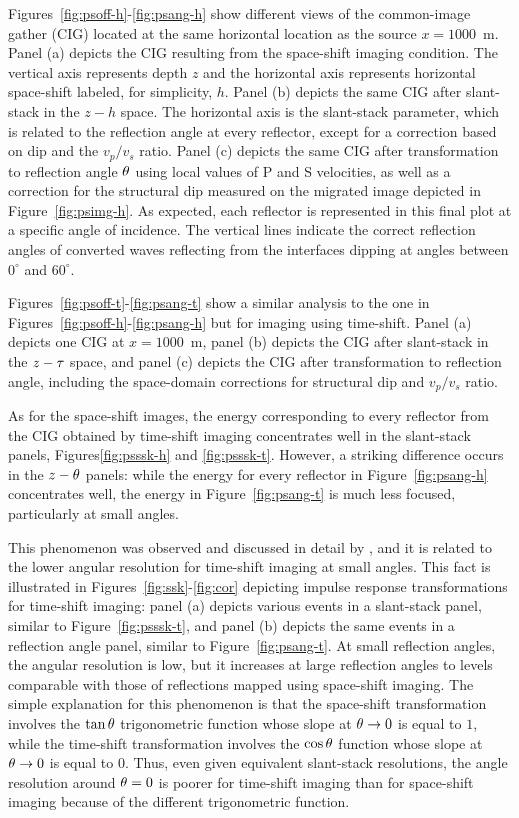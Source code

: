 Figures~\ref{fig:psoff-h}-\ref{fig:psang-h}
show different views of the common-image gather (CIG) located at the 
same horizontal location as the source $x=1000$~m.
Panel (a) depicts the CIG resulting from the space-shift imaging
condition. The vertical axis represents depth $z$ and the horizontal
axis represents horizontal space-shift labeled, for simplicity, $h$.
Panel (b) depicts the same CIG after slant-stack in the $z-h$ space.
The horizontal axis is the slant-stack parameter, which is related to
the reflection angle at every reflector, except for a correction based
on dip and the $v_p/v_s$ ratio.
Panel (c) depicts the same CIG after transformation to reflection 
angle $\t$ using local values of P and S velocities, as well as a 
correction for the structural dip measured on the migrated image
depicted in Figure~\ref{fig:psimg-h}.
As expected, each reflector is represented in this final plot at
a specific angle of incidence. The vertical lines indicate the 
correct reflection angles of converted waves reflecting from the 
interfaces dipping at angles between $0^\circ$ and $60^\circ$.

Figures~\ref{fig:psoff-t}-\ref{fig:psang-t} show a similar analysis
to the one in Figures~\ref{fig:psoff-h}-\ref{fig:psang-h} but for
imaging using time-shift.
Panel (a) depicts one CIG at $x=1000$~m,
panel (b) depicts the CIG after slant-stack in the $z-\tt$ space, and
panel (c) depicts the CIG after transformation to reflection angle,
including the space-domain corrections for structural dip and 
$v_p/v_s$ ratio.

As for the space-shift images, the energy corresponding to every reflector
from the CIG obtained by time-shift imaging concentrates well in the 
slant-stack panels, Figures\ref{fig:psssk-h} and \ref{fig:psssk-t}.
However, a striking difference occurs in the $z-\t$ panels:
while the energy for every reflector 
in Figure~\ref{fig:psang-h} concentrates well,
the energy in Figure~\ref{fig:psang-t} is much less focused, 
particularly at small angles.

This phenomenon was observed and discussed in detail by 
\cite{SavaFomel.segab2.2005}, and it is related to the lower angular resolution 
for time-shift imaging at small angles. This fact is illustrated
in Figures~\ref{fig:ssk}-\ref{fig:cor} depicting impulse response
transformations for time-shift imaging:
panel (a) depicts various events in a slant-stack panel,
similar to Figure~\ref{fig:psssk-t}, and
panel (b) depicts the same events in a reflection angle panel,
similar to Figure~\ref{fig:psang-t}.
At small reflection angles, the angular resolution is low, but it increases
at large reflection angles to levels comparable with those of 
reflections mapped using space-shift imaging.
The simple explanation for this phenomenon is that 
the space-shift transformation involves the $\tan \t$ trigonometric
function whose slope at $\t \rightarrow 0$ is equal to $1$,
while the time-shift transformation involves the $\cos \t$ function
whose slope at $\t \rightarrow 0$ is equal to $0$.
Thus, even given equivalent slant-stack resolutions,
the angle resolution around $\t=0$ is poorer for time-shift
imaging than for space-shift imaging because of the
different trigonometric function.

